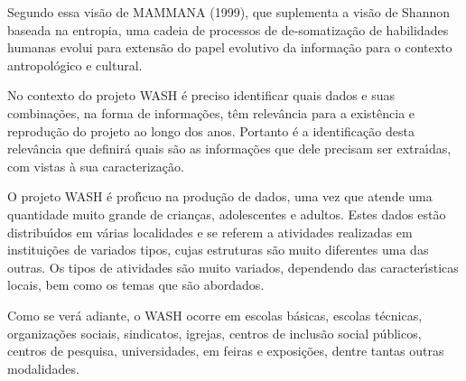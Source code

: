 \documentclass[
12pt,		%
openright,	%
twoside,  %
a4paper,			%
chapter=TITLE,		%
english,			%
french,				%
spanish,			%
brazil				%
]{USPSC-classe/USPSC_RedarTex}
\begin{document}
\noindent\begin{center}\mbox{\centering{}}\end{center}


Segundo essa vis\~ao de  MAMMANA (1999), que suplementa a vis\~ao de Shannon baseada na entropia, uma cadeia de processos de de-somatiza\c{c}\~ao de habilidades humanas evolui para extens\~ao do papel evolutivo da informa\c{c}\~ao para o contexto antropol\'ogico e cultural.








No contexto do projeto WASH \'e preciso identificar quais dados e suas combina\c{c}\~oes, na forma de informa\c{c}\~oes, t\^em relev\^ancia para a exist\^encia e reprodu\c{c}\~ao do projeto ao longo dos anos. Portanto \'e a identifica\c{c}\~ao desta relev\^ancia que definir\'a quais s\~ao as informa\c{c}\~oes que dele precisam ser extra\'{\i}das, com vistas \`a sua caracteriza\c{c}\~ao.








O projeto WASH \'e prof\'{\i}cuo na produ\c{c}\~ao de dados, uma vez que atende uma quantidade muito grande de crian\c{c}as, adolescentes e adultos. Estes dados est\~ao distribu\'{\i}dos em v\'arias localidades e se referem a atividades realizadas em institui\c{c}\~oes de variados tipos, cujas estruturas s\~ao muito diferentes uma das outras. Os tipos de atividades s\~ao muito variados, dependendo das caracter\'{\i}sticas locais, bem como os temas que s\~ao abordados.








Como se ver\'a adiante, o WASH ocorre  em escolas b\'asicas, escolas t\'ecnicas, organiza\c{c}\~oes sociais, sindicatos, igrejas, centros de inclus\~ao social p\'ublicos, centros de pesquisa, universidades, em feiras e exposi\c{c}\~oes, dentre tantas outras modalidades.
\end{document}
